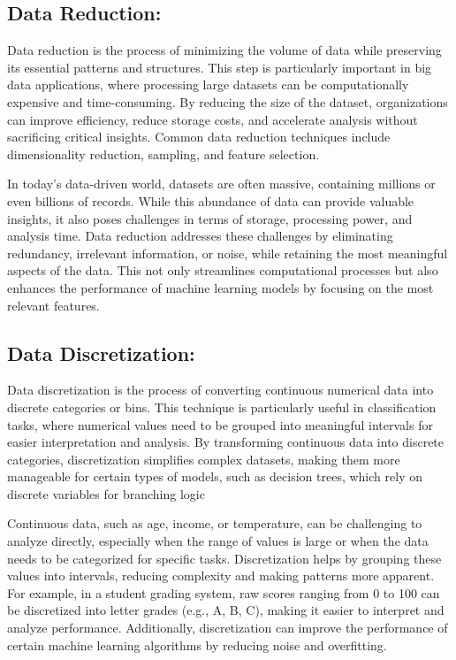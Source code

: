 \documentclass[12pt]{article}
\begin{document}
\subsection{Data Reduction:} 
Data reduction is the process of minimizing the volume of data while preserving its essential patterns and structures. This step is particularly important in big data applications, where processing large datasets can be computationally expensive and time-consuming. By reducing the size of the dataset, organizations can improve efficiency, reduce storage costs, and accelerate analysis without sacrificing critical insights. Common data reduction techniques include dimensionality reduction, sampling, and feature selection.

In today’s data-driven world, datasets are often massive, containing millions or even billions of records. While this abundance of data can provide valuable insights, it also poses challenges in terms of storage, processing power, and analysis time. Data reduction addresses these challenges by eliminating redundancy, irrelevant information, or noise, while retaining the most meaningful aspects of the data. This not only streamlines computational processes but also enhances the performance of machine learning models by focusing on the most relevant features.

\subsection{Data Discretization:} 
Data discretization is the process of converting continuous numerical data into discrete categories or bins. This technique is particularly useful in classification tasks, where numerical values need to be grouped into meaningful intervals for easier interpretation and analysis. By transforming continuous data into discrete categories, discretization simplifies complex datasets, making them more manageable for certain types of models, such as decision trees, which rely on discrete variables for branching logic

Continuous data, such as age, income, or temperature, can be challenging to analyze directly, especially when the range of values is large or when the data needs to be categorized for specific tasks. Discretization helps by grouping these values into intervals, reducing complexity and making patterns more apparent. For example, in a student grading system, raw scores ranging from 0 to 100 can be discretized into letter grades (e.g., A, B, C), making it easier to interpret and analyze performance. Additionally, discretization can improve the performance of certain machine learning algorithms by reducing noise and overfitting.
\end{document}
